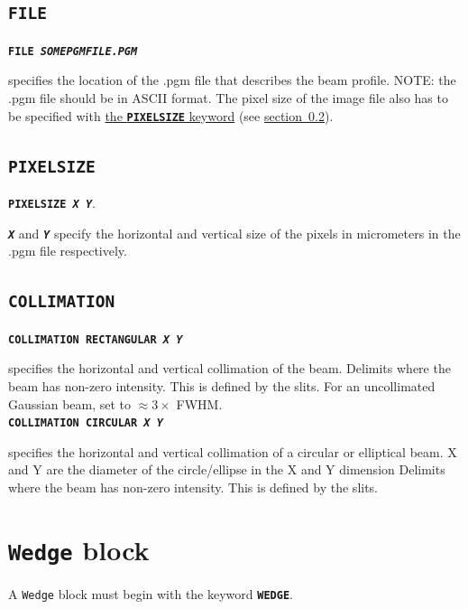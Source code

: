 \documentclass[a4paper]{article}
\newcommand{\Class}[1]{\texttt{#1}\xspace}
\newcommand{\Keyword}[1]{\texttt{\textbf{#1}}\xspace}
\newcommand{\SB}{\\[0.2em]}
\begin{document}
\subsection{\Keyword{FILE}}
\label{file}

\noindent \Keyword{FILE \textit{SOMEPGMFILE.PGM}}

specifies the location of the .pgm file that describes the beam profile. NOTE: the .pgm file should be in ASCII format. The pixel size of the image file also has to be specified with \hyperref[pixelsize]{the \Keyword{PIXELSIZE} keyword} (see \hyperref[pixelsize]{section~\ref*{pixelsize}}).\SB

\subsection{\Keyword{PIXELSIZE}}
\label{pixelsize}

\noindent \Keyword{PIXELSIZE \textit{X Y}}.

\Keyword{\textit{X}} and \Keyword{\textit{Y}} specify the horizontal and vertical size of the pixels in micrometers in the .pgm file respectively.

\subsection{\Keyword{COLLIMATION}}

\noindent \Keyword{COLLIMATION RECTANGULAR \textit{X Y}}

specifies the horizontal and vertical collimation of the beam.
Delimits where the beam has non-zero intensity.
This is defined by the slits.
For an uncollimated Gaussian beam, set to $\approx 3 \times$ FWHM. \SB


\noindent \Keyword{COLLIMATION CIRCULAR \textit{X Y}}

specifies the horizontal and vertical collimation of a circular or elliptical beam.
X and Y are the diameter of the circle/ellipse in the X and Y dimension
Delimits where the beam has non-zero intensity.
This is defined by the slits.

%

\section{\Class{Wedge} block}

A \Class{Wedge} block must begin with the keyword \Keyword{WEDGE}.
\end{document}
